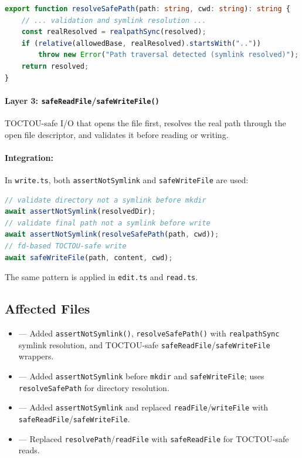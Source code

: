 \begin{lstlisting}[language=TypeScript]
export function resolveSafePath(path: string, cwd: string): string {
    // ... validation and symlink resolution ...
    const realResolved = realpathSync(resolved);
    if (relative(allowedBase, realResolved).startsWith(".."))
        throw new Error("Path traversal detected (symlink resolved)");
    return resolved;
}
\end{lstlisting}

\paragraph{Layer 3: \texttt{safeReadFile}/\texttt{safeWriteFile()}} TOCTOU-safe I/O that opens the file first, resolves the real path through the open file descriptor, and validates it before reading or writing.

\paragraph{Integration:} In \texttt{write.ts}, both \texttt{assertNotSymlink} and \texttt{safeWriteFile} are used:

\begin{lstlisting}[language=TypeScript]
// validate directory not a symlink before mkdir
await assertNotSymlink(resolvedDir);
// validate final path not a symlink before write
await assertNotSymlink(resolveSafePath(path, cwd));
// fd-based TOCTOU-safe write
await safeWriteFile(path, content, cwd);
\end{lstlisting}

The same pattern is applied in \texttt{edit.ts} and \texttt{read.ts}.

\subsection*{Affected Files}
\begin{itemize}
    \item {} --- Added \texttt{assertNotSymlink()}, \texttt{resolveSafePath()} with \texttt{realpathSync} symlink resolution, and TOCTOU-safe \texttt{safeReadFile}/\texttt{safeWriteFile} wrappers.
    \item {} --- Added \texttt{assertNotSymlink} before \texttt{mkdir} and \texttt{safeWriteFile}; uses \texttt{resolveSafePath} for directory resolution.
    \item {} --- Added \texttt{assertNotSymlink} and replaced \texttt{readFile}/\texttt{writeFile} with \texttt{safeReadFile}/\texttt{safeWriteFile}.
    \item {} --- Replaced \texttt{resolvePath}/\texttt{readFile} with \texttt{safeReadFile} for TOCTOU-safe reads.
\end{itemize}

